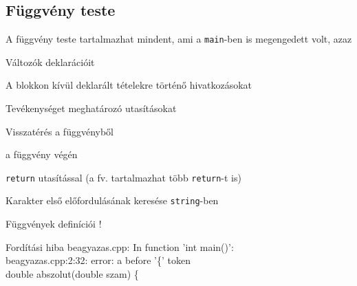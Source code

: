 \documentclass[usenames,dvipsnames,aspectratio=169]{beamer}
\begin{document}
\subsection{Függvény teste}
\begin{frame}
  A függvény teste tartalmazhat mindent, ami a \texttt{main}-ben is megengedett volt, azaz
  \begin{compactitem}
    \small
    \item Változók deklarációit
    \item A blokkon kívül deklarált tételekre történő hivatkozásokat
    \item Tevékenységet meghatározó utasításokat
  \end{compactitem}
  \vfill
  Visszatérés a függvényből
  \begin{compactitem}
    \small
    \item a függvény végén
    \item \texttt{return} utasítással (a fv. tartalmazhat több \texttt{return}-t is)
  \end{compactitem}
  \vfill
  \begin{exampleblock}{ Karakter első előfordulásának keresése \texttt{string}-ben}
    \footnotesize
    \vspace{-.2cm}
    
    \vspace{-.2cm}
  \end{exampleblock}
\end{frame}

\begin{frame}
  Függvények definíciói !
  \begin{exampleblock}{}
    \small
    \vspace{-.2cm}
    
    \vspace{-.2cm}
  \end{exampleblock}
  \begin{block}{Fordítási hiba}
    \scriptsize
beagyazas.cpp: In function 'int main()':\\
beagyazas.cpp:2:32: error: a  before '\{' token\\
  double abszolut(double szam) \{\\
  \end{block}
\end{frame}
\end{document}
